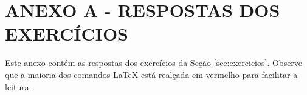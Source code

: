 \renewcommand{\thechapter}{}%
\chapter{ANEXO A - RESPOSTAS DOS EXERCÍCIOS} %
\label{anexoA} %
\renewcommand{\thechapter}{A}%

Este anexo contém as respostas dos exercícios da Seção \ref{sec:exercicios}. Observe que a maioria dos comandos \LaTeX{} está realçada em vermelho para facilitar a leitura.

\tcbinputrecords